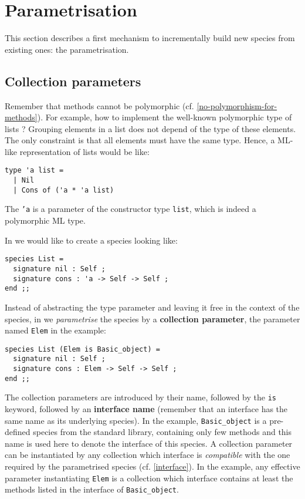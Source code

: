 
\section{Parametrisation}
\label{parametrisation}

This section describes a first mechanism to incrementally build new
species from existing ones: the parametrisation.
\subsection{Collection parameters}
\label{collection-parameter}
Remember that methods cannot be polymorphic
(cf. \ref{no-polymorphism-for-methods}). For
example, how to implement the well-known polymorphic type of
lists ?  Grouping elements in a list does not depend  of
the type of these elements. The only constraint is that all elements
must have the same type. Hence, a ML-like representation of lists would be
like:
{\scriptsize
\lstset{language=Caml}
\begin{lstlisting}
type 'a list =
  | Nil
  | Cons of ('a * 'a list)
\end{lstlisting}
}

The {\tt 'a} is a parameter of the constructor type {\tt list}, which
is indeed a polymorphic ML type.

In {\focal} we would like to create a species looking like: {\scriptsize
\begin{lstlisting}
species List =
  signature nil : Self ;
  signature cons : 'a -> Self -> Self ;
end ;;
\end{lstlisting}
}

Instead of abstracting the type parameter and leaving it free in the
context of the species, in {\focal} we {\em parametrise} the species
by a {\bf collection parameter}, the parameter named {\tt Elem} in the example:
{\scriptsize
\begin{lstlisting}
species List (Elem is Basic_object) =
  signature nil : Self ;
  signature cons : Elem -> Self -> Self ;
end ;;
\end{lstlisting}
}

The collection parameters are introduced by their name, followed by the {\tt is}
keyword, followed by an {\bf interface name} (remember that an interface has
the same name as its underlying species). In the example, {\tt Basic\_object}
is a pre-defined species from the standard library, containing only few
methods and this name is used here to denote the interface of this species.
A collection parameter can be instantiated by any collection which interface
is {\em compatible} with the one required by
the parametrised species (cf. \ref{interface}). In the example, any effective
parameter instantiating {\tt Elem} is a collection which interface contains
at least the methods listed in the interface of {\tt Basic\_object}.

